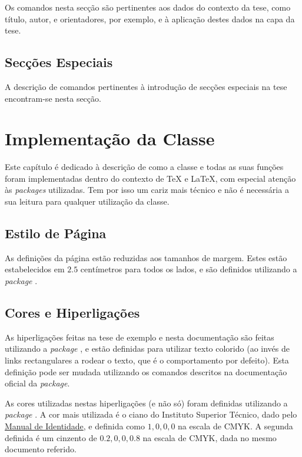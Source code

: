\documentclass{../ist-thesis}
\begin{document}
Os comandos nesta secção são pertinentes aos dados do contexto da tese, como título, autor, e orientadores, por exemplo, e à aplicação destes dados na capa da tese.

\section{Secções Especiais}\label{sec:spec}

A descrição de comandos pertinentes à introdução de secções especiais na tese encontram-se nesta secção.

\chapter{Implementação da Classe}

Este capítulo é dedicado à descrição de como a classe e todas as suas funções foram implementadas dentro do contexto de \TeX{} e \LaTeX{}, com especial atenção às \textit{packages} utilizadas. Tem por isso um cariz mais técnico e não é necessária a sua leitura para qualquer utilização da classe.

\section{Estilo de Página}

As definições da página estão reduzidas aos tamanhos de margem. Estes estão estabelecidos em $2.5$ centímetros para todos os lados, e são definidos utilizando a \textit{package} .

\section{Cores e Hiperligações}

As hiperligações feitas na tese de exemplo e nesta documentação são feitas utilizando a \textit{package} , e estão definidas para utilizar texto colorido (ao invés de links rectangulares a rodear o texto, que é o comportamento por defeito). Esta definição pode ser mudada utilizando os comandos descritos na documentação oficial da \textit{package}.

As cores utilizadas nestas hiperligações (e não só) foram definidas utilizando a \textit{package} . A cor mais utilizada é o ciano do Instituto Superior Técnico, dado pelo \href{https://tecnico.ulisboa.pt/pt/sobre-o-tecnico/institucional/logo-e-manual-de-identidade/}{Manual de Identidade}, e definida como $1,0,0,0$ na escala de CMYK. A segunda definida é um cinzento de $0.2,0,0,0.8$ na escala de CMYK, dada no mesmo documento referido.
\end{document}
